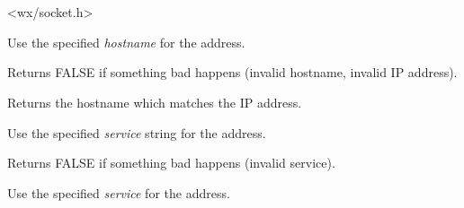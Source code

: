 \section{}\label{wxipv4address}




<wx/socket.h>



%
%



Use the specified {\it hostname} for the address.


Returns FALSE if something bad happens (invalid hostname, invalid IP address). 

%
%



Returns the hostname which matches the IP address.

%
%



Use the specified {\it service} string for the address.


Returns FALSE if something bad happens (invalid service).

%
%



Use the specified {\it service} for the address.

